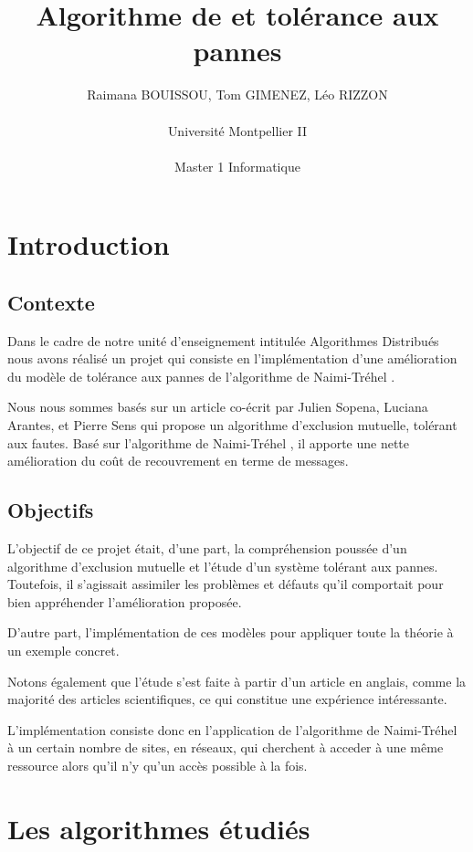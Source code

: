 \documentclass[a4paper,12pt]{report}
\title{Algorithme de \nt et tolérance aux pannes  \vspace{0.5cm}}
\author{Raimana BOUISSOU, Tom GIMENEZ, Léo RIZZON\\  \\Université Montpellier II \\  \\Master 1 Informatique}
\date{}
\newcommand{\nt}{Naimi-Tréhel }
\begin{document}
\maketitle

\tableofcontents

\newpage

\chapter{Introduction}


\section*{Contexte}

Dans le cadre de notre unité d'enseignement intitulée Algorithmes Distribués nous avons réalisé un projet qui consiste en l'implémentation d'une amélioration du modèle de tolérance aux pannes de l'algorithme de \nt.

Nous nous sommes basés sur un article co-écrit par Julien Sopena, Luciana Arantes, et Pierre Sens qui propose un algorithme d'exclusion mutuelle, tolérant aux fautes. Basé sur l'algorithme de \nt, il apporte une nette amélioration du coût de recouvrement en terme de messages.

\section*{Objectifs}

L'objectif de ce projet était, d'une part, la compréhension poussée d'un algorithme d'exclusion mutuelle et l'étude d'un système tolérant aux pannes.  Toutefois, il s'agissait assimiler les problèmes et défauts qu'il comportait pour bien appréhender l'amélioration proposée.

D'autre part, l'implémentation de ces modèles pour appliquer toute la théorie à un exemple concret.

Notons également que l'étude s'est faite à partir d'un article en anglais, comme la majorité des articles scientifiques, ce qui constitue une expérience intéressante.

L'implémentation consiste donc en l'application de l'algorithme de \nt à un certain nombre de sites, en réseaux, qui cherchent à acceder à une même ressource alors qu'il n'y qu'un accès possible à la fois.

\newpage

\chapter{Les algorithmes étudiés}
\end{document}
